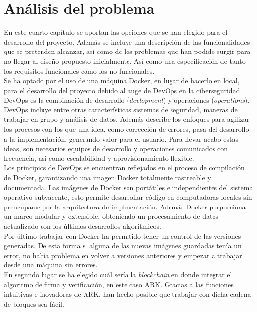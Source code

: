 \chapter{Análisis del problema}

En este cuarto capítulo se aportan las opciones que se han elegido para el desarrollo del proyecto. Además se incluye una descripción de las funcionalidades que se pretenden alcanzar, así como de los problemas que han podido surgir para no llegar al diseño propuesto inicialmente. Así como una especificación de tanto los requisitos funcionales como los no funcionales.\\

Se ha optado por el uso de una máquina Docker, en lugar de hacerlo en local, para el desarrollo del proyecto debido al auge de DevOps en la ciberseguridad.\\

DevOps es la combinación de desarrollo (\textit{devlopment}) y operaciones (\textit{operations})\cite{devops-redhat}. DevOps incluye entre otras características sistemas de seguridad, maneras de trabajar en grupo y análisis de datos. Además describe los enfoques para agilizar los procesos con los que una idea, como corrección de errores, pasa del desarrollo a la implementación, generando valor para el usuario. Para llevar acabo estas ideas, son necesarios equipos de desarrollo y operaciones comunicados con frecuencia, así como escalabilidad y aprovisionamiento flexible.\\

Los principios de DevOps se encuentran reflejados en el proceso de compilación de Docker, garantizando una imagen Docker totalmente rastreable y documentada. Las imágenes de Docker son portátiles e independientes del sistema operativo subyacente, esto permite desarrollar código en computadoras locales sin preocuparse por la arquitectura de implmentación. Además Docker porporciona un marco modular y extensible, obteniendo un procesamiento de datos actualizado con los últimos desarrollos algorítmicos\cite{docker-devops}.\\

Por último trabajar con Docker ha permitido tener un control de las versiones generadas. De esta forma si alguna de las nuevas imágenes guardadas tenía un error, no había problema en volver a versiones anteriores y empezar a trabajar desde una máquina sin errores.\\

En segundo lugar se ha elegido cuál sería la \textit{blockchain} en donde integrar el algoritmo de firma y verificación, en este caso ARK. Gracias a las funciones intuitivas e inovadoras de ARK, han hecho posible que trabajar con dicha cadena de bloques sea fácil.\\

